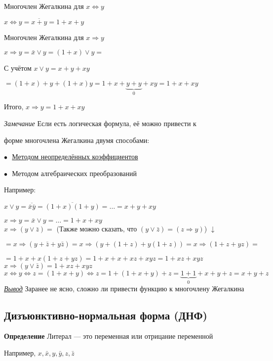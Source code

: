 \documentclass[a4paper, 12pt] {article}
\begin{document}
Многочлен Жегалкина для $ x \Leftrightarrow y $

$ x \Leftrightarrow y = \overline{x+y} =1+x+y$

Многочлен Жегалкина для $ x \Rightarrow y $

$ x \Rightarrow y = \bar x \vee y = (1+x) \vee y= $

С учётом $ x \vee y = x+y+xy $

$ = (1+x)+y+(1+x)y=1+x+\underbrace{y+y}_0+xy=1+x+xy$

Итого, $ x \Rightarrow y = 1+x+xy $

\textit{Замечание} Если есть логическая формула, её можно привести к 

форме многочлена Жегалкина двумя способами:

$ \bullet $ $  $ \hyperlink{a1}{Методом неопределённых коэффициентов}

$ \bullet $ $  $ Методом алгебраических преобразований

Например: 

$ x \vee y = \overline{ \bar x \bar y } = \overline{(1+x)(1+y)}= \dots =x+y+xy$

$ x \Rightarrow y = \bar x \vee y = \dots =1+x+xy$\\

$ x \Rightarrow (y \vee \bar z) = $ (Также можно сказать, что $ (y \vee \bar z) = (z \Rightarrow y) $) $ \downarrow $

$ = x \Rightarrow (y + \bar z + y\bar z) = x \Rightarrow (y + (1+z) + y(1+z)) = x \Rightarrow (1+z + yz) =$

$ = 1+x+x(1+z + yz)=1+x+x+xz+xyz=1+xz+xyz$\\

$ x \Rightarrow (y \vee \bar z) = 1+xz+xyz$\\

$ x \Leftrightarrow y \Leftrightarrow z= (1+x+y) \Leftrightarrow z = 1+ (1+x+y)+z = \underbrace{1+ 1}_0+x+y+z = x+y+z $\\

\underline{\textit{Вывод}}
Заранее не ясно, сложно ли привести функцию к многочлену Жегалкина

\subsection{Дизъюнктивно-нормальная форма (ДНФ)}

\textbf{Определение} Литерал --- это переменная или отрицание переменной

Например, $ x, \bar x, y, \bar y, z, \bar z $\\
\end{document}

